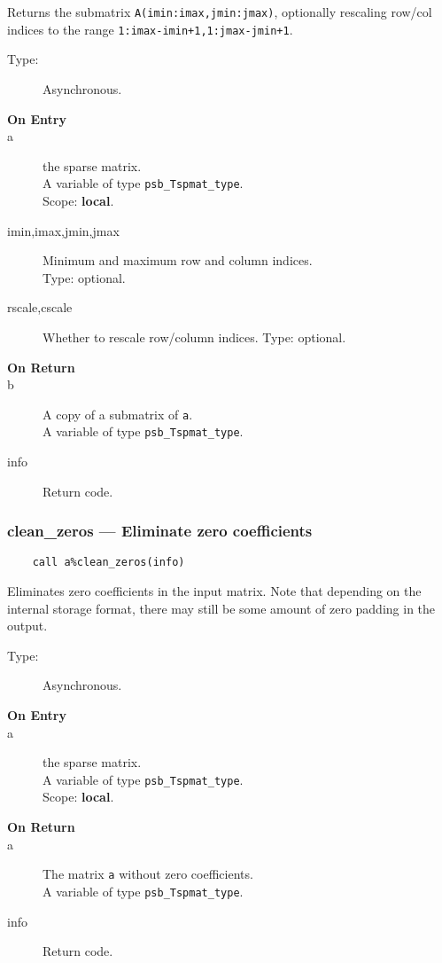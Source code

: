 Returns the submatrix \verb|A(imin:imax,jmin:jmax)|, optionally
rescaling row/col indices to the range
\verb|1:imax-imin+1,1:jmax-jmin+1|.  
\begin{description}
\item[Type:] Asynchronous.
\item[\bf On Entry]
\item[a] the sparse matrix.\\
A variable of type \verb|psb_Tspmat_type|.\\
Scope: {\bf local}.\\
\item[imin,imax,jmin,jmax] Minimum and maximum row and column indices.\\
Type: optional.
\item[rscale,cscale] Whether to rescale row/column indices.
Type: optional.
\end{description}
\begin{description}
\item[\bf On Return]
\item[b] A copy  of a submatrix of \verb|a|.\\
A variable of type \verb|psb_Tspmat_type|.
\item[info] Return code. 
\end{description}

\subsubsection*{clean\_zeros --- Eliminate zero coefficients}
\begin{verbatim}
    call a%clean_zeros(info)
\end{verbatim}

Eliminates zero coefficients in the input matrix. Note that depending
on the internal storage format, there may still be some amount of
zero padding in the output.

\begin{description}
\item[Type:] Asynchronous.
\item[\bf On Entry]
\item[a] the sparse matrix.\\
A variable of type \verb|psb_Tspmat_type|.\\
Scope: {\bf local}.\\
\end{description}
\begin{description}
\item[\bf On Return]
\item[a] The matrix  \verb|a| without zero coefficients.\\
A variable of type \verb|psb_Tspmat_type|.
\item[info] Return code. 
\end{description}

